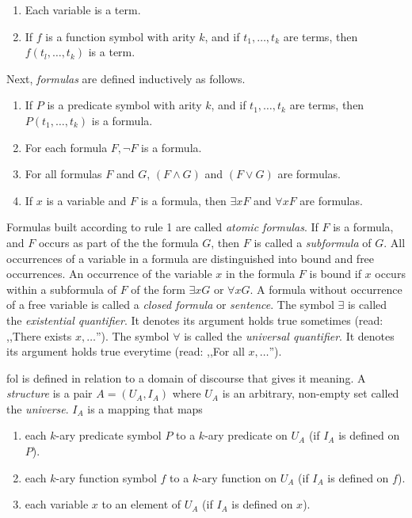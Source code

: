 \begin{enumerate}
    \item Each variable is a term.
    \item If $f$ is a function symbol with arity $k$, and if $t_1, \ldots, t_k$ are terms, then $f(t_l, \ldots, t_k)$ is a term.
\end{enumerate}

\noindent
Next, \textit{formulas} are defined inductively as follows.

\begin{enumerate}
    \item If $P$ is a predicate symbol with arity $k$, and if $t_1, \ldots ,t_k$ are terms, then $P(t_1 , \ldots, t_k )$ is a formula.
    \item For each formula $F, \lnot F$ is a formula.
    \item For all formulas $F$ and $G$, $(F \wedge G)$ and $(F \vee G)$ are formulas.
    \item If $x$ is a variable and $F$ is a formula, then $\exists xF$ and $\forall xF$ are formulas.
\end{enumerate}

Formulas built according to rule 1 are called \textit{atomic formulas}.
If $F$ is a formula, and $F$ occurs as part of the the formula $G$, then $F$ is called a \textit{subformula} of $G$.
All occurrences of a variable in a formula are distinguished into bound and free occurrences.
An occurrence of the variable $x$ in the formula $F$ is bound if $x$ occurs within a subformula of $F$ of the form $\exists xG$ or $\forall xG$.
A formula without occurrence of a free variable is called a \textit{closed formula} or \textit{sentence}.
The symbol $\exists$ is called the \textit{existential quantifier}.
It denotes its argument holds true sometimes (read: ,,There exists $x, \ldots$'').
The symbol $\forall$ is called the \textit{universal quantifier}.
It denotes its argument holds true everytime (read: ,,For all $x, \ldots$'').

\gls{fol} is defined in relation to a domain of discourse that gives it meaning.
A \textit{structure} is a pair $A = (U_A, I_A)$ where $U_A$ is an arbitrary, non-empty set called the \textit{universe}.
$I_A$ is a mapping that maps

\begin{enumerate}
    \item each $k$-ary predicate symbol $P$ to a $k$-ary predicate on $U_A$ (if $I_A$ is defined on $P$).
    \item each $k$-ary function symbol $f$ to a $k$-ary function on $U_A$ (if $I_A$ is defined on $f$).
    \item each variable $x$ to an element of $U_A$ (if $I_A$ is defined on $x$).
\end{enumerate}

